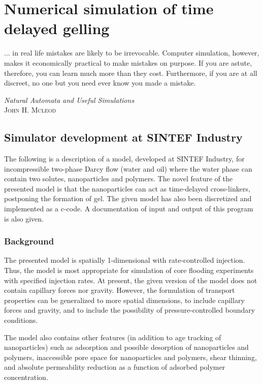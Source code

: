 \chapter{Numerical simulation of time delayed gelling } \label{chap:simulation}
\vspace*{\fill}
\epigraph{... in real life mistakes are likely to be irrevocable. Computer simulation, however, makes it economically practical to make mistakes on purpose. If you are astute, therefore, you can learn much more than they cost. Furthermore, if you are at all discreet, no one but you need ever know you made a mistake.}%
{\textit{Natural Automata and Useful Simulations}\\ \textsc{John H. Mcleod}}
\clearpage{\thispagestyle{empty}\cleardoublepage}
\section{Simulator development at SINTEF Industry}
The following is a description of a model, developed at SINTEF Industry, for incompressible two-phase Darcy flow (water and oil) where the water phase can contain two solutes, nanoparticles and polymers. The novel feature of the presented model is that the nanoparticles can act as time-delayed cross-linkers, postponing the formation of gel. The given model has also been discretized and implemented as a c-code. A documentation of input and output of this program is also given.

\subsection{Background}
The presented model is spatially 1-dimensional with rate-controlled injection. Thus, the model is most appropriate for simulation of core flooding experiments with specified injection rates. At present, the given version of the model does not contain capillary forces nor gravity. However, the formulation of transport properties can be generalized to more spatial dimensions, to include capillary forces and gravity, and to include the possibility of pressure-controlled boundary conditions. 

The model also contains other features (in addition to age tracking of nanoparticles) such as adsorption and possible desorption of nanoparticles and polymers, inaccessible pore space for nanoparticles and polymers, shear thinning, and absolute permeability reduction as a function of adsorbed polymer concentration. 

